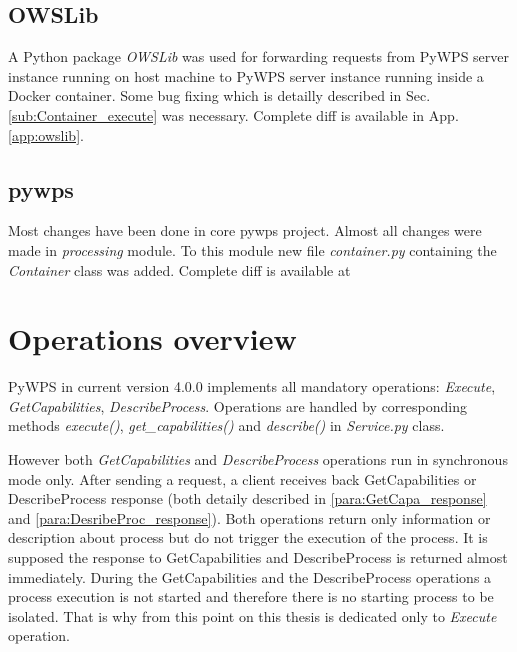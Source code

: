 \documentclass[12pt,a4paper]{article}
\begin{document}
\subsection{OWSLib}
A Python package \textit{OWSLib} was used for forwarding requests from PyWPS server instance running on host machine to PyWPS server instance
running inside a Docker container. Some bug fixing  which is detailly described in Sec.\ref{sub:Container_execute} was necessary. Complete
diff is available in App. \ref{app:owslib}.

\subsection{pywps}
Most changes have been done in core pywps project. Almost all changes were made in \textit{processing} module. To this module new file
\textit{container.py} containing the \textit{Container} class was added. Complete diff is available at


\newpage
\section{Operations overview}
\label{sec:operations_ov}
PyWPS in current version 4.0.0 implements all mandatory operations: \textit{Execute}, \textit{GetCapabilities}, \textit{DescribeProcess}.
Operations are handled by corresponding methods \textit{execute()}, \textit{get\_capabilities()} and \textit{describe()} in \textit{Service.py} class. 

However both \textit{GetCapabilities} and \textit{DescribeProcess} operations run in synchronous mode only. After sending a request,
a client receives back GetCapabilities or DescribeProcess response (both detaily described in \ref{para:GetCapa_response} and \ref{para:DesribeProc_response}). Both operations return only information or description about process but do not trigger the
execution of the process. It is supposed the response to GetCapabilities and DescribeProcess is returned almost immediately.
During the GetCapabilities and the DescribeProcess operations a process execution is not started and therefore there is no
starting process to be isolated. That is why from this point on this thesis is dedicated only to \textit{Execute} operation.
\end{document}
